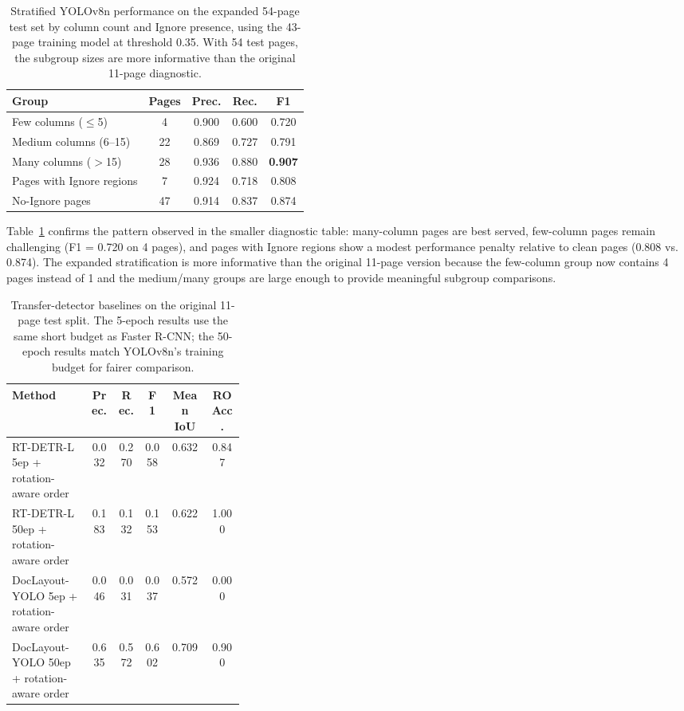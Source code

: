 \documentclass[12pt]{article}
\begin{document}
\begin{table}[t]
\centering
\scriptsize\setlength{\tabcolsep}{3pt}
\caption{Stratified YOLOv8n performance on the expanded 54-page test set by column count and Ignore presence, using the 43-page training model at threshold 0.35. With 54 test pages, the subgroup sizes are more informative than the original 11-page diagnostic.}
\label{tab:stratified_expanded}
\begin{tabular}{lcccc}
\toprule
Group & Pages & Prec. & Rec. & F1 \\
\midrule
Few columns ($\leq$5) & 4 & 0.900 & 0.600 & 0.720 \\
Medium columns (6--15) & 22 & 0.869 & 0.727 & 0.791 \\
Many columns ($>$15) & 28 & 0.936 & 0.880 & \textbf{0.907} \\
Pages with Ignore regions & 7 & 0.924 & 0.718 & 0.808 \\
No-Ignore pages & 47 & 0.914 & 0.837 & 0.874 \\
\bottomrule
\end{tabular}
\end{table}

Table~\ref{tab:stratified_expanded} confirms the pattern observed in the smaller diagnostic table: many-column pages are best served, few-column pages remain challenging (F1 = 0.720 on 4 pages), and pages with Ignore regions show a modest performance penalty relative to clean pages (0.808 vs. 0.874). The expanded stratification is more informative than the original 11-page version because the few-column group now contains 4 pages instead of 1 and the medium/many groups are large enough to provide meaningful subgroup comparisons.

\begin{table}[t]
\centering
\scriptsize\setlength{\tabcolsep}{3pt}
\caption{Transfer-detector baselines on the original 11-page test split. The 5-epoch results use the same short budget as Faster R-CNN; the 50-epoch results match YOLOv8n's training budget for fairer comparison.}
\label{tab:transfer_baselines}
\begin{tabular}{p{0.34\linewidth}ccccc}
\toprule
Method & Prec. & Rec. & F1 & Mean IoU & RO Acc. \\
\midrule
RT-DETR-L 5ep + rotation-aware order & 0.032 & 0.270 & 0.058 & 0.632 & 0.847 \\
RT-DETR-L 50ep + rotation-aware order & 0.183 & 0.132 & 0.153 & 0.622 & 1.000 \\
DocLayout-YOLO 5ep + rotation-aware order & 0.046 & 0.031 & 0.037 & 0.572 & 0.000 \\
DocLayout-YOLO 50ep + rotation-aware order & 0.635 & 0.572 & 0.602 & 0.709 & 0.900 \\
\bottomrule
\end{tabular}
\end{table}
\end{document}
